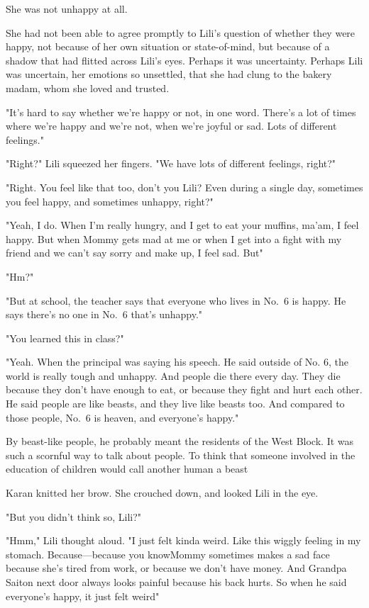 She was not unhappy at all.

She had not been able to agree promptly to Lili's question of whether
they were happy, not because of her own situation or state-of-mind, but
because of a shadow that had flitted across Lili's eyes. Perhaps it was
uncertainty. Perhaps Lili was uncertain, her emotions so unsettled, that
she had clung to the bakery madam, whom she loved and trusted.

"It's hard to say whether we're happy or not, in one word. There's a lot
of times where we're happy and we're not, when we're joyful or sad. Lots
of different feelings."

"Right?" Lili squeezed her fingers. "We have lots of different feelings,
right?"

"Right. You feel like that too, don't you Lili? Even during a single
day, sometimes you feel happy, and sometimes unhappy, right?"

"Yeah, I do. When I'm really hungry, and I get to eat your muffins,
ma'am, I feel happy. But when Mommy gets mad at me or when I get into a
fight with my friend and we can't say sorry and make up, I feel sad.
But\el "

"Hm?"

"But at school, the teacher says that everyone who lives in No.~6 is
happy. He says there's no one in No.~6 that's unhappy."

"You learned this in class?"

"Yeah. When the principal was saying his speech. He said outside of No.
6, the world is really tough and unhappy. And people die there every
day. They die because they don't have enough to eat, or because they
fight and hurt each other. He said people are like beasts, and they live
like beasts too. And compared to those people, No.~6 is heaven, and
everyone's happy."

By beast-like people, he probably meant the residents of the West Block.
It was such a scornful way to talk about people. To think that someone
involved in the education of children would call another human a
beast\el 

Karan knitted her brow. She crouched down, and looked Lili in the eye.

"But you didn't think so, Lili?"

"Hmm," Lili thought aloud. "I just felt kinda weird. Like this wiggly
feeling in my stomach. Because---because you know\el Mommy sometimes makes
a sad face because she's tired from work, or because we don't have
money. And Grandpa Saiton next door always looks painful because his
back hurts. So when he said everyone's happy, it just felt weird\el "

